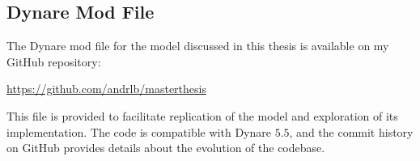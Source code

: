 \documentclass[../thesis.tex]{subfiles}
\begin{document}
\newpage

\subsection{Dynare Mod File}

The Dynare mod file for the model discussed in this thesis is available on my GitHub repository:

\url{https://github.com/andrlb/masterthesis}

This file is provided to facilitate replication of the model and exploration of its implementation. The code is compatible with Dynare $5.5$, and the commit history on GitHub provides details about the evolution of the codebase.
\end{document}
